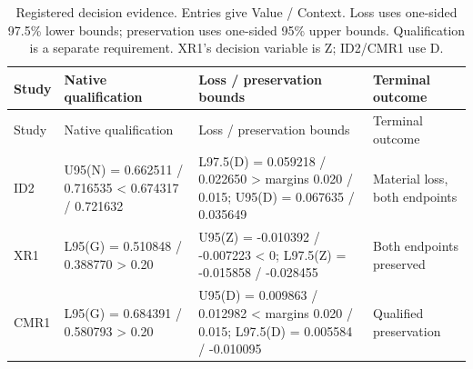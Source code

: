 \begin{longtable}[]{@{}
  >{\raggedright\arraybackslash}p{}
  >{\raggedright\arraybackslash}p{}
  >{\raggedright\arraybackslash}p{}
  >{\raggedright\arraybackslash}p{}@{}}
\caption{Registered decision evidence. Entries give Value / Context. Loss uses one-sided 97.5\% lower bounds; preservation uses one-sided 95\% upper bounds. Qualification is a separate requirement. XR1's decision variable is Z; ID2/CMR1 use D.}\label{tbl:3}\tabularnewline
\toprule\noalign{}
\begin{minipage}[b]{\linewidth}\raggedright
Study
\end{minipage} & \begin{minipage}[b]{\linewidth}\raggedright
Native qualification
\end{minipage} & \begin{minipage}[b]{\linewidth}\raggedright
Loss / preservation bounds
\end{minipage} & \begin{minipage}[b]{\linewidth}\raggedright
Terminal outcome
\end{minipage} \\
\midrule\noalign{}
\endfirsthead
\toprule\noalign{}
\begin{minipage}[b]{\linewidth}\raggedright
Study
\end{minipage} & \begin{minipage}[b]{\linewidth}\raggedright
Native qualification
\end{minipage} & \begin{minipage}[b]{\linewidth}\raggedright
Loss / preservation bounds
\end{minipage} & \begin{minipage}[b]{\linewidth}\raggedright
Terminal outcome
\end{minipage} \\
\midrule\noalign{}
\endhead
\bottomrule\noalign{}
\endlastfoot
ID2 & U95(N) = 0.662511 / 0.716535 \textless{} 0.674317 / 0.721632 & L97.5(D) = 0.059218 / 0.022650 \textgreater{} margins 0.020 / 0.015; U95(D) = 0.067635 / 0.035649 & Material loss, both endpoints \\
XR1 & L95(G) = 0.510848 / 0.388770 \textgreater{} 0.20 & U95(Z) = -0.010392 / -0.007223 \textless{} 0; L97.5(Z) = -0.015858 / -0.028455 & Both endpoints preserved \\
CMR1 & L95(G) = 0.684391 / 0.580793 \textgreater{} 0.20 & U95(D) = 0.009863 / 0.012982 \textless{} margins 0.020 / 0.015; L97.5(D) = 0.005584 / -0.010095 & Qualified preservation \\
\end{longtable}

